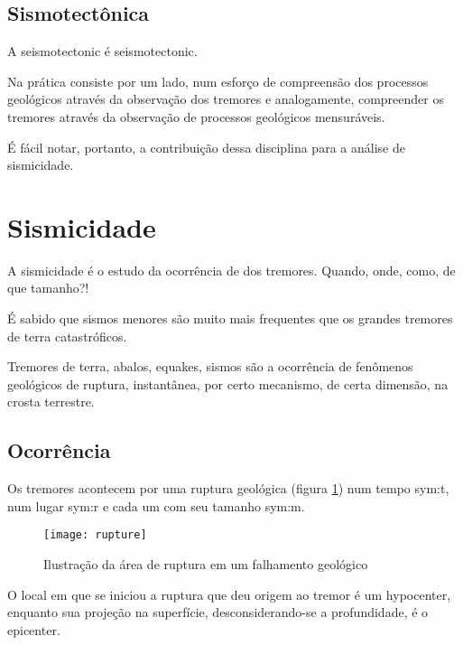 \subsection{Sismotectônica}
\label{sec:sismotectonica}

A \gls{seismotectonic} é \glsdesc*{seismotectonic}. 

Na prática consiste por um lado, num esforço de compreensão dos
processos geológicos através da observação dos tremores e analogamente, compreender os tremores através da observação
de processos geológicos mensuráveis.  

É fácil notar, portanto, a contribuição dessa disciplina para a análise de sismicidade.


\section{Sismicidade}
\label{sec:sismicidade}

A sismicidade é o estudo da ocorrência de dos tremores. Quando, onde, como, de que tamanho?!

É sabido que sismos menores são muito mais frequentes que os grandes tremores de terra
catastróficos.

Tremores de terra, abalos, \glspl{equake}, sismos são a ocorrência de
fenômenos geológicos de ruptura, instantânea, por certo mecanismo, de certa dimensão, na
crosta terrestre.


\subsection{Ocorrência}
\label{sec:ocorrencia}
 
Os tremores acontecem por uma ruptura geológica (figura \ref{f:rupture}) num tempo \gls{sym:t}, num lugar \gls{sym:r} e cada um
com seu tamanho \gls{sym:m}.

\begin{figure}[H]
   \centering
   \texttt{[image: rupture]}
   \caption[Ilustração da área de ruptura em um falhamento geológico]
   		   {Ilustração da área de ruptura em um falhamento geológico\footnotemark} 
   \label{f:rupture}
\end{figure} 
 

O local em que se iniciou a ruptura que deu origem ao tremor é um \gls{hypocenter},
enquanto sua projeção na superfície, desconsiderando-se a profundidade, é o \gls{epicenter}.


